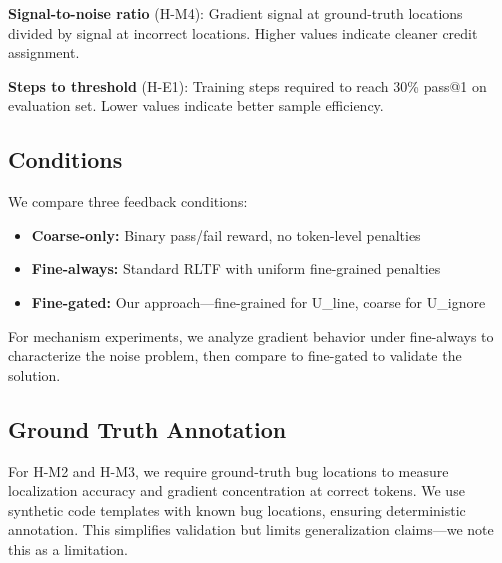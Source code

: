 \textbf{Signal-to-noise ratio} (H-M4): Gradient signal at ground-truth locations divided by signal at incorrect locations. Higher values indicate cleaner credit assignment.

\textbf{Steps to threshold} (H-E1): Training steps required to reach 30\% pass@1 on evaluation set. Lower values indicate better sample efficiency.

\subsection{Conditions}

We compare three feedback conditions:

\begin{itemize}
\item \textbf{Coarse-only:} Binary pass/fail reward, no token-level penalties
\item \textbf{Fine-always:} Standard RLTF with uniform fine-grained penalties
\item \textbf{Fine-gated:} Our approach---fine-grained for U\_line, coarse for U\_ignore
\end{itemize}

For mechanism experiments, we analyze gradient behavior under fine-always to characterize the noise problem, then compare to fine-gated to validate the solution.

\subsection{Ground Truth Annotation}

For H-M2 and H-M3, we require ground-truth bug locations to measure localization accuracy and gradient concentration at correct tokens. We use synthetic code templates with known bug locations, ensuring deterministic annotation. This simplifies validation but limits generalization claims---we note this as a limitation.
